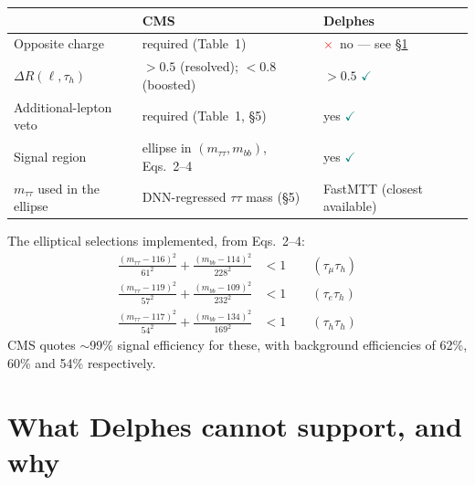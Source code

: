 \documentclass[11pt,a4paper]{article}
\newcommand{\tauh}{\tau_{h}}
\newcommand{\mtautau}{m_{\tau\tau}}
\newcommand{\mbb}{m_{bb}}
\newcommand{\ok}{\textcolor{teal}{$\checkmark$}}
\newcommand{\no}{\textcolor{red}{$\times$}}
\begin{document}
\begin{table}[htbp]
\centering\small
\begin{tabular}{@{}lp{5.6cm}p{5.4cm}@{}}
\toprule
& \textbf{CMS} & \textbf{Delphes} \\
\midrule
Opposite charge & required (Table~1) & \no\ no --- see \S\ref{sec:cannot} \\
$\Delta R(\ell,\tauh)$ & $>0.5$ (resolved); $<0.8$ (boosted) & $>0.5$ \ok \\
Additional-lepton veto & required (Table~1, \S5) & yes \ok \\
Signal region & ellipse in $(\mtautau,\mbb)$, Eqs.~2--4 & yes \ok \\
$\mtautau$ used in the ellipse & DNN-regressed $\tau\tau$ mass (\S5)
  & FastMTT (closest available) \\
\bottomrule
\end{tabular}
\end{table}

\noindent The elliptical selections implemented, from Eqs.~2--4:
\begin{align*}
\frac{(\mtautau-116)^2}{61^2} + \frac{(\mbb-114)^2}{228^2} &< 1 \qquad (\tau_\mu\tauh) \\
\frac{(\mtautau-119)^2}{57^2} + \frac{(\mbb-109)^2}{232^2} &< 1 \qquad (\tau_e\tauh) \\
\frac{(\mtautau-117)^2}{54^2} + \frac{(\mbb-134)^2}{169^2} &< 1 \qquad (\tauh\tauh)
\end{align*}
CMS quotes $\sim$99\% signal efficiency for these, with background efficiencies of
62\%, 60\% and 54\% respectively.

\section{What Delphes cannot support, and why}
\label{sec:cannot}
\end{document}
